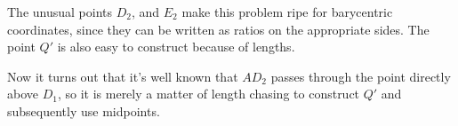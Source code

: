 \begin{soln}

\end{soln}

\seccm
The unusual points $D_2$, and $E_2$ make this problem ripe for barycentric coordinates, since they can be written as ratios on the appropriate sides.  The point $Q'$ is also easy to construct because of lengths.

Now it turns out that it's well known that $AD_2$ passes through the point directly above $D_1$, so it is merely a matter of length chasing to construct $Q'$ and subsequently use midpoints.
